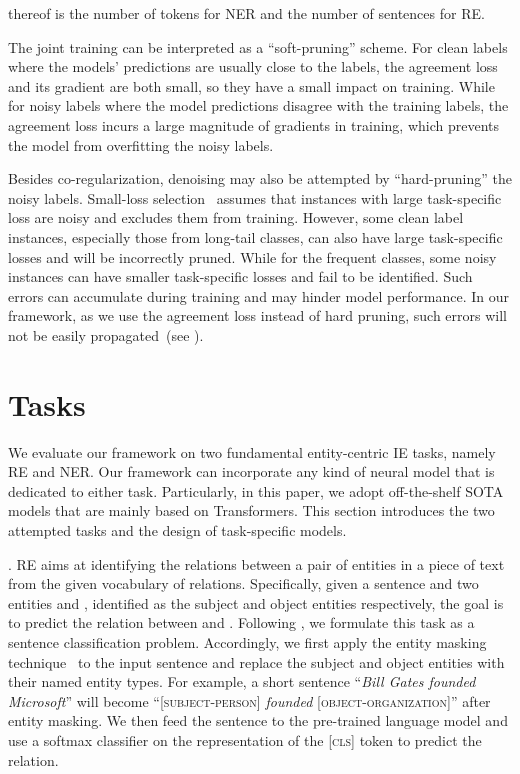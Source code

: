 \documentclass[11pt]{article}
\newcommand{\stitle}[1]{\vspace{0.3em}\noindent{\bf #1}}
\begin{document}
 thereof is the number of tokens for NER and the number of sentences for RE.

The joint training can be interpreted as a ``soft-pruning'' scheme.
For clean labels where the models' predictions are usually close to the labels, the agreement loss and its gradient are both small, so they have a small impact on training.
While for noisy labels where the model predictions disagree with the training labels, the agreement loss incurs a large magnitude of gradients in training, which prevents the model from overfitting the noisy labels.

Besides co-regularization, denoising may also be attempted by ``hard-pruning'' the noisy labels.
Small-loss selection~\cite{Jiang2018MentorNetLD,Han2018CoteachingRT} assumes that instances with large task-specific loss are noisy and excludes them from training.
However, some clean label instances, especially those from long-tail classes, can also have large task-specific losses and will be incorrectly pruned.
While for the frequent classes, some noisy instances can have smaller task-specific losses and fail to be identified.
Such errors can accumulate during training and may hinder model performance.
In our framework, as we use the agreement loss instead of hard pruning, such errors will not be easily propagated~(see ).

\section{Tasks}



We evaluate our framework on two fundamental entity-centric IE tasks, namely RE and NER.
Our framework can incorporate any kind of neural model that is dedicated to either task.
Particularly, in this paper, we adopt off-the-shelf SOTA models that are mainly based on Transformers.
This section introduces the two attempted tasks and the design of task-specific models.

\stitle{Relation extraction}.
RE aims at identifying the relations between a pair of entities in a piece of text from the given vocabulary of relations.
Specifically, given a sentence  and two entities  and , identified as the subject and object entities respectively, the goal is to predict the relation between  and .
Following \citet{Shi2019SimpleBM}, we formulate this task as a sentence classification problem.
Accordingly, we first apply the entity masking technique~\cite{Zhang2017PositionawareAA} to the input sentence and replace the subject and object entities with their named entity types.
For example, a short sentence ``\textit{Bill Gates founded Microsoft}'' will become ``\textsc{[subject-person]} \textit{founded} \textsc{[object-organization]}'' after entity masking.
We then feed the sentence to the pre-trained language model and use a softmax classifier on the representation of the \textsc{[cls]} token to predict the relation.
\end{document}
